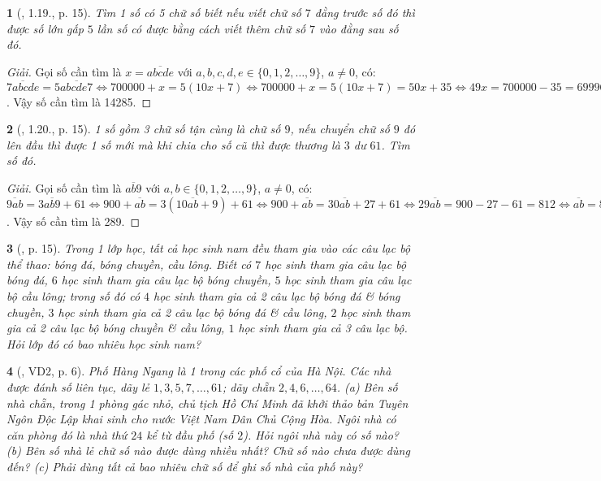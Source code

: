 \documentclass{article}
\newtheorem{baitoan}{}
\begin{document}
\begin{baitoan}[\cite{Binh_boi_duong_Toan_6_tap_1}, 1.19., p. 15]
	Tìm 1 số có 5 chữ số biết nếu viết chữ số $7$ đằng trước số đó thì được số lớn gấp $5$ lần số có được bằng cách viết thêm chữ số $7$ vào đằng sau số đó.
\end{baitoan}

\begin{proof}[Giải]
	Gọi số cần tìm là $x = \overline{abcde}$ với $a,b,c,d,e\in\{0,1,2,\ldots,9\}$, $a\ne0$, có: $\overline{7abcde} = 5\overline{abcde7}\Leftrightarrow700000 + x = 5(10x + 7)\Leftrightarrow700000 + x = 5(10x + 7) = 50x  + 35\Leftrightarrow49x = 700000 - 35 = 699965\Leftrightarrow x = 699965:49 = 14285$. Vậy số cần tìm là 14285.
\end{proof}

\begin{baitoan}[\cite{Binh_boi_duong_Toan_6_tap_1}, 1.20., p. 15]
	1 số gồm 3 chữ số tận cùng là chữ số $9$, nếu chuyển chữ số $9$ đó lên đầu thì được 1 số mới mà khi chia cho số cũ thì được thương là $3$ dư $61$. Tìm số đó.
\end{baitoan}

\begin{proof}[Giải]
	Gọi số cần tìm là $\overline{ab9}$ với $a,b\in\{0,1,2,\ldots,9\}$, $a\ne0$, có: $\overline{9ab} = 3\overline{ab9} + 61\Leftrightarrow900 + \overline{ab} = 3(10\overline{ab} + 9) + 61\Leftrightarrow900 + \overline{ab} = 30\overline{ab} + 27 + 61\Leftrightarrow29\overline{ab} = 900 - 27 - 61 = 812\Leftrightarrow\overline{ab} = 812:29 = 28$. Vậy số cần tìm là 289.
\end{proof}

\begin{baitoan}[\cite{Binh_boi_duong_Toan_6_tap_1}, p. 15]
	Trong 1 lớp học, tất cả học sinh nam đều tham gia vào các câu lạc bộ thể thao: bóng đá, bóng chuyền, cầu lông. Biết có $7$ học sinh tham gia câu lạc bộ bóng đá, $6$ học sinh tham gia câu lạc bộ bóng chuyền, $5$ học sinh tham gia câu lạc bộ cầu lông; trong số đó có $4$ học sinh tham gia cả 2 câu lạc bộ bóng đá \& bóng chuyền, $3$ học sinh tham gia cả 2 câu lạc bộ bóng đá \& cầu lông, $2$ học sinh tham gia cả 2 câu lạc bộ bóng chuyền \& cầu lông, $1$ học sinh tham gia cả 3 câu lạc bộ. Hỏi lớp đó có bao nhiêu học sinh nam?
\end{baitoan}

\begin{baitoan}[\cite{Tuyen_Toan_6}, VD2, p. 6]
	Phố Hàng Ngang là 1 trong các phố cổ của Hà Nội. Các nhà được đánh số liên tục, dãy lẻ $1,3,5,7,\ldots,61$; dãy chẵn $2,4,6,\ldots,64$. (a) Bên số nhà chẵn, trong 1 phòng gác nhỏ, chủ tịch Hồ Chí Minh đã khởi thảo bản Tuyên Ngôn Độc Lập khai sinh cho nước Việt Nam Dân Chủ Cộng Hòa. Ngôi nhà có căn phòng đó là nhà thứ $24$ kể từ đầu phố (số $2$). Hỏi ngôi nhà này có số nào? (b) Bên số nhà lẻ chữ số nào được dùng nhiều nhất? Chữ số nào chưa được dùng đến? (c) Phải dùng tất cả bao nhiêu chữ số để ghi số nhà của phố này?
\end{baitoan}
\end{document}
